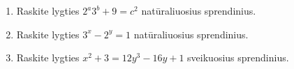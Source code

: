 \begin{enumerate}
  \item \text{[JBMO 2009]} Raskite lygties $2^a 3^b + 9 = c^2$
    natūraliuosius sprendinius.
  \item Raskite lygties $3^x - 2^y = 1$ natūraliuosius sprendinius.
  \item Raskite lygties $x^2 + 3 = 12y^3 - 16y + 1$ sveikuosius
    sprendinius.
\end{enumerate}
